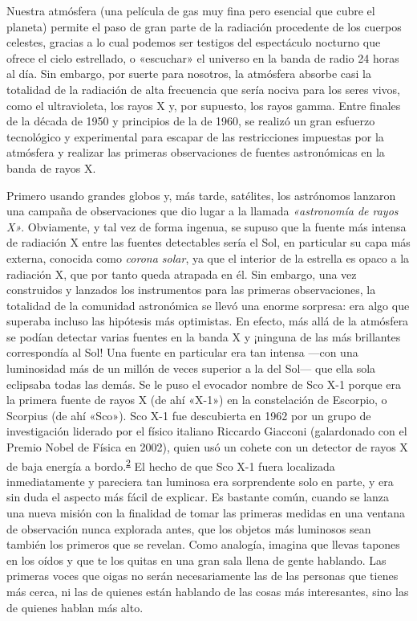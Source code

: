 Nuestra atmósfera (una película de gas muy fina pero esencial que cubre el planeta) permite el paso de gran parte de la radiación procedente de los cuerpos celestes, gracias a lo cual podemos ser testigos del espectáculo nocturno que ofrece el cielo estrellado, o «escuchar» el universo en la banda de radio 24 horas al día. Sin embargo, por suerte para nosotros, la atmósfera absorbe casi la totalidad de la radiación de alta frecuencia que sería nociva para los seres vivos, como el ultravioleta, los rayos X y, por supuesto, los rayos gamma. Entre finales de la década de 1950 y principios de la de 1960, se realizó un gran esfuerzo tecnológico y experimental para escapar de las restricciones impuestas por la atmósfera y realizar las primeras observaciones de fuentes astronómicas en la banda de rayos X.

Primero usando grandes globos y, más tarde, satélites, los astrónomos lanzaron una campaña de observaciones que dio lugar a la llamada \emph{«astronomía de rayos X»}. Obviamente, y tal vez de forma ingenua, se supuso que la fuente más intensa de radiación X entre las fuentes detectables sería el Sol, en particular su capa más externa, conocida como \emph{corona solar}, ya que el interior de la estrella es opaco a la radiación X, que por tanto queda atrapada en él. Sin embargo, una vez construidos y lanzados los instrumentos para las primeras observaciones, la totalidad de la comunidad astronómica se llevó una enorme sorpresa: era algo que superaba incluso las hipótesis más optimistas. En efecto, más allá de la atmósfera se podían detectar varias fuentes en la banda X y ¡ninguna de las más brillantes correspondía al Sol! Una fuente en particular era tan intensa ---con una luminosidad más de un millón de veces superior a la del Sol--- que ella sola eclipsaba todas las demás. Se le puso el evocador nombre de Sco X-1 porque era la primera fuente de rayos X (de ahí «X-1») en la constelación de Escorpio, o Scorpius (de ahí «Sco»). Sco X-1 fue descubierta en 1962 por un grupo de investigación liderado por el físico italiano Riccardo Giacconi (galardonado con el Premio Nobel de Física en 2002), quien usó un cohete con un detector de rayos X de baja energía a bordo.\textsuperscript{\hyperlink{note:05-02}{2}} El hecho de que Sco X-1 fuera localizada inmediatamente y pareciera tan luminosa era sorprendente solo en parte, y era sin duda el aspecto más fácil de explicar. Es bastante común, cuando se lanza una nueva misión con la finalidad de tomar las primeras medidas en una ventana de observación nunca explorada antes, que los objetos más luminosos sean también los primeros que se revelan. Como analogía, imagina que llevas tapones en los oídos y que te los quitas en una gran sala llena de gente hablando. Las primeras voces que oigas no serán necesariamente las de las personas que tienes más cerca, ni las de quienes están hablando de las cosas más interesantes, sino las de quienes hablan más alto.

